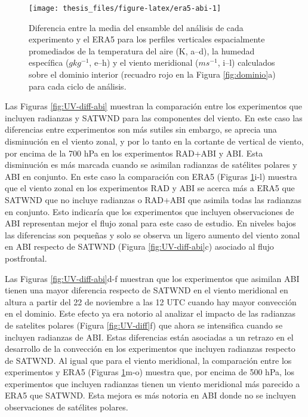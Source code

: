 \documentclass[12pt,oneside,a4paper]{reedthesis}
\begin{document}
\begin{figure}

\texttt{[image: thesis\_files/figure-latex/era5-abi-1]} \hfill{}

\caption{Diferencia entre la media del ensamble del análisis de cada experimento y el ERA5 para los perfiles verticales espacialmente promediados de la temperatura del aire (K, a--d), la humedad específica (\(g kg^{-1}\), e--h) y el viento meridional (\(m s^{-1}\), i--l) calculados sobre el dominio interior (recuadro rojo en la Figura \ref{fig:dominio}a) para cada ciclo de análisis.}\label{fig:era5-abi}
\end{figure}
Las Figuras \ref{fig:UV-diff-abi} muestran la comparación entre los experimentos que incluyen radianzas y SATWND para las componentes del viento. En este caso las diferencias entre experimentos son más sutiles sin embargo, se aprecia una disminución en el viento zonal, y por lo tanto en la cortante de vertical de viento, por encima de la 700 hPa en los experimentos RAD+ABI y ABI. Esta disminución es más marcada cuando se asimilan radianzas de satélites polares y ABI en conjunto. En este caso la comparación con ERA5 (Figuras \ref{fig:era5-abi}i-l) muestra que el viento zonal en los experimentos RAD y ABI se acerca más a ERA5 que SATWND que no incluye radianzas o RAD+ABI que asimila todas las radianzas en conjunto. Esto indicaría que los experimentos que incluyen observaciones de ABI representan mejor el flujo zonal para este caso de estudio. En niveles bajos las diferencias son pequeñas y solo se observa un ligero aumento del viento zonal en ABI respecto de SATWND (Figura \ref{fig:UV-diff-abi}c) asociado al flujo postfrontal.

Las Figuras \ref{fig:UV-diff-abi}d-f muestran que los experimentos que asimilan ABI tienen una mayor diferencia respecto de SATWND en el viento meridional en altura a partir del 22 de noviembre a las 12 UTC cuando hay mayor convección en el dominio. Este efecto ya era notorio al analizar el impacto de las radianzas de satelites polares (Figura \ref{fig:UV-diff}f) que ahora se intensifica cuando se incluyen radianzas de ABI. Estas diferencias están asociadas a un retrazo en el desarrollo de la convección en los experimentos que incluyen radianzas respecto de SATWND. Al igual que para el viento meridional, la comparación entre los experimentos y ERA5 (Figuras \ref{fig:era5-abi}m-o) muestra que, por encima de 500 hPa, los experimentos que incluyen radianzas tienen un viento meridional más parecido a ERA5 que SATWND. Esta mejora es más notoria en ABI donde no se incluyen observaciones de satélites polares.
\end{document}
